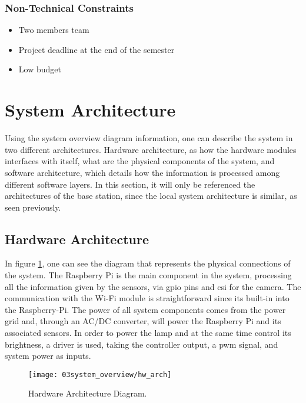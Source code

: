\subsubsection{Non-Technical Constraints}
\begin{itemize}
        \item Two members team
        \item Project deadline at the end of the semester
        \item Low budget
\end{itemize}

\section{System Architecture}
Using the system overview diagram information, one can describe the system in two different architectures. Hardware architecture, as how the hardware modules interfaces with itself, what are the physical components of the system, and software architecture, which details how the information is processed among different software layers. In this section, it will only be referenced the architectures of the base station, since the local system architecture is similar, as seen previously. 

\subsection{Hardware Architecture}
In figure \ref{fig:hw_arch}, one can see the diagram that represents the physical connections of the system. The Raspberry Pi is the main component in the system, processing all the information given by the sensors, via \ac{gpio} pins and \ac{csi} for the camera. The communication with the Wi-Fi module is straightforward since its built-in into the Raspberry-Pi.
The power of all system components comes from the power grid and, through an AC/DC converter, will power the Raspberry Pi and its associated sensors.
In order to power the lamp and at the same time control its brightness, a driver is used, taking the controller output, a \ac{pwm} signal, and system power as inputs. 

\clearpage 
\begin{figure}[ht]
	\centering
	\texttt{[image: 03system\_overview/hw\_arch]}
	\caption{Hardware Architecture Diagram.}
	\label{fig:hw_arch}
\end{figure}

